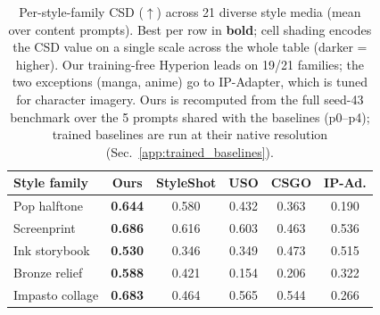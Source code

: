 \begin{table}[t]
  \centering
  \caption{Per-style-family CSD ($\uparrow$) across 21 diverse style media
  (mean over content prompts). Best per row in
  \textbf{bold}; cell shading encodes the CSD value on a single scale
  across the whole table (darker = higher). Our training-free Hyperion leads on
  19/21 families; the two
  exceptions (manga, anime) go to IP-Adapter, which is tuned for character imagery.
  Ours is recomputed from the full seed-43 benchmark over the 5 prompts
  shared with the baselines (p0--p4); trained baselines are run at their
  native resolution (Sec.~\ref{app:trained_baselines}).}
  \label{tab:percat}
  \footnotesize
  \setlength{\tabcolsep}{4.5pt}
  \begin{tabular}{l ccccc}
  \toprule
  Style family & Ours & StyleShot & USO & CSGO & IP-Ad. \\
  \midrule
  Pop halftone     & \cellcolor{tabshade!43}\textbf{0.644} & \cellcolor{tabshade!37}0.580 & \cellcolor{tabshade!24}0.432 & \cellcolor{tabshade!18}0.363 & \cellcolor{tabshade!3}0.190 \\
  Screenprint      & \cellcolor{tabshade!47}\textbf{0.686} & \cellcolor{tabshade!41}0.616 & \cellcolor{tabshade!40}0.603 & \cellcolor{tabshade!27}0.463 & \cellcolor{tabshade!34}0.536 \\
  Ink storybook    & \cellcolor{tabshade!33}\textbf{0.530} & \cellcolor{tabshade!17}0.346 & \cellcolor{tabshade!17}0.349 & \cellcolor{tabshade!28}0.473 & \cellcolor{tabshade!32}0.515 \\
  Bronze relief    & \cellcolor{tabshade!38}\textbf{0.588} & \cellcolor{tabshade!23}0.421 & \cellcolor{tabshade!0}0.154 & \cellcolor{tabshade!5}0.206 & \cellcolor{tabshade!15}0.322 \\
  Impasto collage  & \cellcolor{tabshade!47}\textbf{0.683} & \cellcolor{tabshade!27}0.464 & \cellcolor{tabshade!36}0.565 & \cellcolor{tabshade!34}0.544 & \cellcolor{tabshade!10}0.266 \\

\end{tabular}
\end{table}
